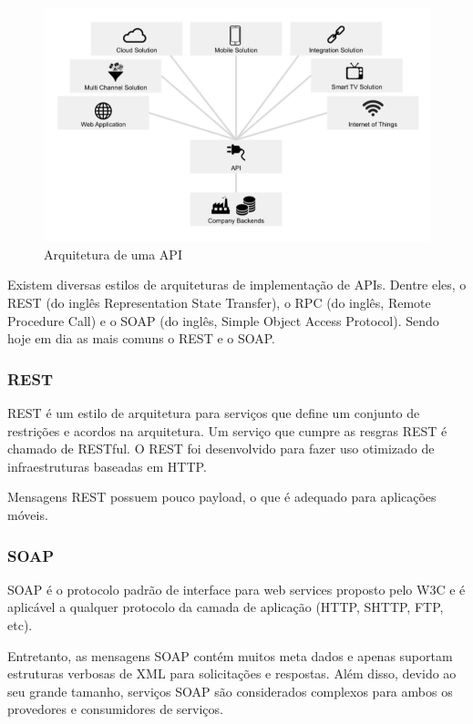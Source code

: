 \begin{figure}[H]
    \centering
    \includegraphics[scale=1]{images/api_architecture}
    \caption[Arquitetura de uma API]
    {Arquitetura de uma API \cite{Biehl2015}}
    \label{fig:api_architecture}
\end{figure}

Existem diversas estilos de arquiteturas de implementação de APIs. Dentre eles,
o REST (do inglês Representation State Transfer), o RPC (do inglês, Remote 
Procedure Call) e o SOAP (do inglês, Simple Object Access Protocol).
Sendo hoje em dia as mais comuns o REST e o SOAP. \cite{Castillo2011}

\subsubsection{REST}
REST é um estilo de arquitetura para serviços que define um conjunto de restrições
e acordos na arquitetura. Um serviço que cumpre as resgras REST é chamado de
RESTful. \cite{Biehl2015}
O REST foi desenvolvido para fazer uso otimizado de infraestruturas baseadas 
em HTTP.  \cite{Biehl2015}

Mensagens REST possuem pouco payload, o que é adequado para aplicações 
móveis. \cite{Wagh2012}

\subsubsection{SOAP}
SOAP é o protocolo padrão de interface para web services proposto pelo W3C e
é aplicável a qualquer protocolo da camada de aplicação (HTTP, SHTTP, FTP, 
etc). \cite{Castillo2011}

Entretanto, as mensagens SOAP contém muitos meta dados e apenas suportam
estruturas verbosas de XML para solicitações e respostas. Além disso, devido
ao seu grande tamanho, serviços SOAP são considerados complexos
para ambos os provedores e consumidores de serviços. \cite{Biehl2015}

